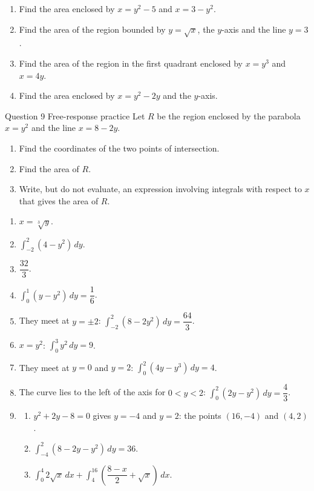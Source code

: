 \documentclass[11pt]{article}
\begin{document}
\begin{enumerate}[leftmargin=*,itemsep=2pt,start=5]
  \item Find the area enclosed by $x=y^2-5$ and $x=3-y^2$.\work{2.8cm}
  \item Find the area of the region bounded by $y=\sqrt{x}$, the $y$-axis and the line $y=3$.\work{2.8cm}
  \item Find the area of the region in the first quadrant enclosed by $x=y^3$ and $x=4y$.\work{2.8cm}
  \item Find the area enclosed by $x=y^2-2y$ and the $y$-axis.\work{2.8cm}
\end{enumerate}

\begin{frbox}{Question 9 \textperiodcentered{} Free-response practice}
Let $R$ be the region enclosed by the parabola $x=y^2$ and the line $x=8-2y$.
\begin{enumerate}[label=(\alph*),leftmargin=*,itemsep=2pt]
  \item Find the coordinates of the two points of intersection.\work{2.6cm}
  \item Find the area of $R$.\work{2.6cm}
  \item Write, but do not evaluate, an expression involving integrals with respect to $x$ that gives the area of $R$.\work{2.6cm}
\end{enumerate}
\end{frbox}

\newpage
\begin{solbox}
\begin{enumerate}[leftmargin=*,itemsep=4pt]
  \item $x=\sqrt[3]{y}$.
  \item $\displaystyle\int_{-2}^{2}(4-y^2)\,dy$.
  \item $\dfrac{32}{3}$.
  \item $\displaystyle\int_{0}^{1}(y-y^2)\,dy=\dfrac16$.
  \item They meet at $y=\pm2$: $\displaystyle\int_{-2}^{2}(8-2y^2)\,dy=\dfrac{64}{3}$.
  \item $x=y^2$: $\displaystyle\int_{0}^{3}y^2\,dy=9$.
  \item They meet at $y=0$ and $y=2$: $\displaystyle\int_{0}^{2}(4y-y^3)\,dy=4$.
  \item The curve lies to the left of the axis for $0<y<2$: $\displaystyle\int_{0}^{2}(2y-y^2)\,dy=\dfrac43$.
  \item \begin{enumerate}[label=(\alph*),leftmargin=*,itemsep=3pt]
    \item $y^2+2y-8=0$ gives $y=-4$ and $y=2$: the points $(16,-4)$ and $(4,2)$.
    \item $\displaystyle\int_{-4}^{2}(8-2y-y^2)\,dy=36$.
    \item $\displaystyle\int_{0}^{4}2\sqrt x\,dx+\displaystyle\int_{4}^{16}\left(\dfrac{8-x}{2}+\sqrt x\right)\,dx$.
  \end{enumerate}
\end{enumerate}
\end{solbox}
\end{document}
